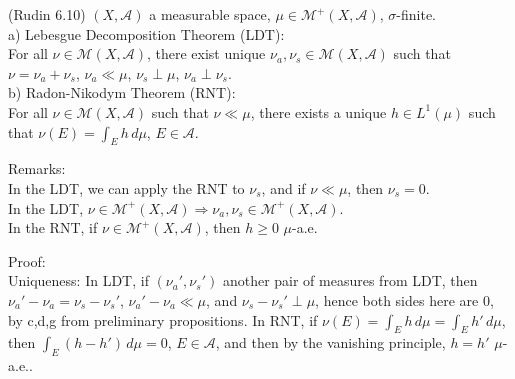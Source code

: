 \documentclass[12pt]{article}
\newcommand{\A}[0] { \mathcal{A} }
\newcommand{\M}[0] { \mathcal{M} }
\newcommand{\rimply}[0] { \Rightarrow }
\begin{document}
(Rudin 6.10) $(X, \A)$ a measurable space, $\mu \in \M^+(X, \A)$, $\sigma$-finite. \\

\noindent 
a) Lebesgue Decomposition Theorem (LDT): \\

\noindent 
For all $\nu \in \M(X, \A)$, there exist unique $\nu_a, \nu_s \in \M(X, \A)$ such that $\nu = \nu_a + \nu_s$, $\nu_a \ll \mu$, $\nu_s \perp \mu$, $\nu_a \perp \nu_s$. \\

\noindent 
b) Radon-Nikodym Theorem (RNT): \\

\noindent 
For all $\nu \in \M(X, \A)$ such that $\nu \ll \mu$, there exists a unique $h \in L^1(\mu)$ such that $ \nu(E) = \int_E h \, d\mu $, $E \in \A$. \\

\vspace{10pt}

\noindent
Remarks:  \\

\noindent
In the LDT, we can apply the RNT to $\nu_s$, and if $\nu \ll \mu$, then $\nu_s = 0$. \\

\noindent
In the LDT, $\nu \in \M^+(X, \A) \rimply \nu_a, \nu_s \in \M^+(X, \A)$. \\

\noindent
In the RNT, if $\nu \in \M^+(X, \A)$, then $h \ge 0$ $\mu$-a.e. \\







\vspace{10pt}


\noindent
Proof: \\

\noindent
Uniqueness: In LDT, if $(\nu_a', \nu_s')$ another pair of measures from LDT, then $\nu_a' - \nu_a = \nu_s - \nu_s'$, $\nu_a' - \nu_a \ll \mu$, and $\nu_s - \nu_s' \perp \mu$, hence both sides here are 0, by c,d,g from preliminary propositions. In RNT, if $ \nu(E) = \int_E h \, d\mu =  \int_E h' \, d\mu $, then $  \int_E (h - h') \, d\mu = 0$, $E \in \A$, and then by the vanishing principle, $h = h'$ $\mu$-a.e.. \\
\end{document}

